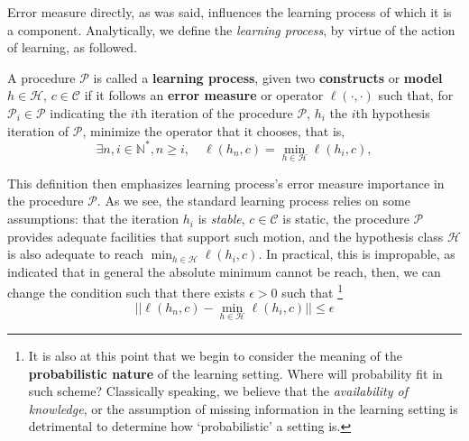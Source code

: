 \documentclass[twoside,10pt]{article}
\begin{document}
Error measure directly, as was said, influences the learning process of which it is a component. Analytically, we define the \textit{learning process}, by virtue of the action of learning, as followed. 
\begin{definition}
  A procedure $\mathcal{P}$ is called a \textbf{learning process}, given two \textbf{constructs} or \textbf{model} $h\in \mathcal{H}$, $c\in \mathcal{C}$ if it follows an \textbf{error measure} or operator $\ell(\cdot, \cdot)$ such that, for $\mathcal{P}_{i}\in \mathcal{P}$ indicating the $i$th iteration of the procedure $\mathcal{P}$, $h_{i}$ the $i$th hypothesis iteration of $\mathcal{P}$, minimize the operator that it chooses, that is,
  \begin{equation}
    \exists n,i\in \mathbb{N}^{*}, n \geq i,  \quad  \ell(h_{n},c) = \min_{h\in \mathcal{H}}\ell(h_{i},c), 
  \end{equation} 
\end{definition}
This definition then emphasizes learning process's error measure importance in the procedure $\mathcal{P}$. As we see, the standard learning process relies on some assumptions: that the iteration $h_{i}$ is \textit{stable}, $c\in \mathcal{C}$ is static, the procedure $\mathcal{P}$ provides adequate facilities that support such motion, and the hypothesis class $\mathcal{H}$ is also adequate to reach $\min_{h\in\mathcal{H}}\ell (h_{i},c)$. In practical, this is impropable, as \cite{10.5555/2371238} indicated that in general the absolute minimum cannot be reach, then, we can change the condition such that there exists $\epsilon > 0$ such that \footnote{It is also at this point that we begin to consider the meaning of the \textbf{probabilistic nature} of the learning setting. Where will probability fit in such scheme? Classically speaking, we believe that the \textit{availability of knowledge}, or the assumption of missing information in the learning setting is detrimental to determine how `probabilistic' a setting is. 
}
\begin{equation}
  \lvert \lvert \ell(h_{n},c) - \min_{h\in \mathcal{H}}\ell(h_{i},c)\rvert \rvert \leq \epsilon
\end{equation}
\end{document}
